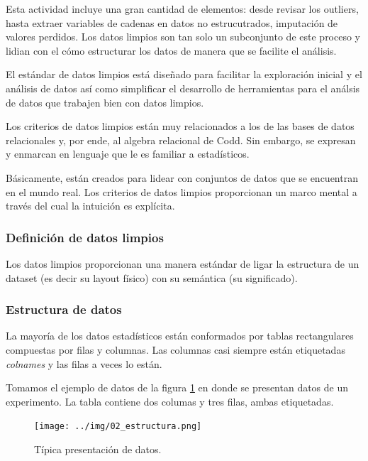 \documentclass[]{article}
\begin{document}
Esta actividad incluye una gran cantidad de elementos: desde revisar los
outliers, hasta extraer variables de cadenas en datos no estrucutrados,
imputación de valores perdidos. Los datos limpios son tan solo un
subconjunto de este proceso y lidian con el cómo estructurar los datos
de manera que se facilite el análisis.

El estándar de datos limpios está diseñado para facilitar la exploración
inicial y el análisis de datos así como simplificar el desarrollo de
herramientas para el análsis de datos que trabajen bien con datos
limpios.

Los criterios de datos limpios están muy relacionados a los de las bases
de datos relacionales y, por ende, al algebra relacional de Codd. Sin
embargo, se expresan y enmarcan en lenguaje que le es familiar a
estadísticos.

Básicamente, están creados para lidear con conjuntos de datos que se
encuentran en el mundo real. Los criterios de datos limpios proporcionan
un marco mental a través del cual la intuición es explícita.

\subsubsection{Definición de datos
limpios}\label{definicion-de-datos-limpios}

Los datos limpios proporcionan una manera estándar de ligar la
estructura de un dataset (es decir su layout físico) con su semántica
(su significado).

\subsubsection{Estructura de datos}\label{estructura-de-datos}

La mayoría de los datos estadísticos están conformados por tablas
rectangulares compuestas por filas y columnas. Las columnas casi siempre
están etiquetadas \emph{colnames} y las filas a veces lo están.

Tomamos el ejemplo de datos de la figura \ref{fig:estructura} en donde
se presentan datos de un experimento. La tabla contiene dos columas y
tres filas, ambas etiquetadas.

\begin{figure}[h]
    \centering
    \texttt{[image: ../img/02\_estructura.png]}
    \caption{Típica presentación de datos.}
    \label{fig:estructura}
\end{figure}
\end{document}
